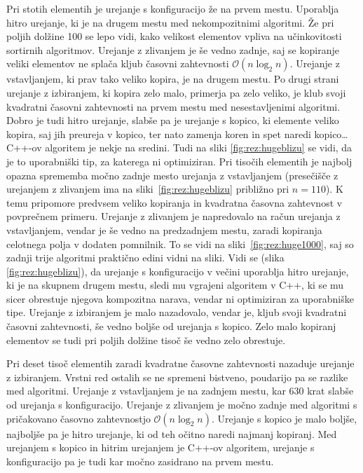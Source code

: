 \documentclass[a4paper,oneside,12pt]{article}
\begin{document}
Pri stotih elementih je urejanje s konfiguracijo že na prvem mestu. Uporablja
hitro urejanje, ki je na drugem mestu med nekompozitnimi algoritmi. Že pri
poljih dolžine 100 se lepo
vidi, kako velikost elementov vpliva na učinkovitosti sortirnih algoritmov.
Urejanje z zlivanjem je še vedno zadnje, saj se kopiranje veliki elementov ne
splača kljub časovni zahtevnosti $\mathcal{O}(n\log_2 n)$. Urejanje z
vstavljanjem, ki prav tako veliko kopira, je na drugem mestu. Po drugi strani
urejanje z izbiranjem, ki kopira zelo malo, primerja pa zelo veliko, je
klub svoji kvadratni časovni zahtevnosti na prvem mestu med nesestavljenimi
algoritmi. Dobro je tudi hitro urejanje, slabše pa je urejanje s kopico, ki
elemente veliko kopira, saj jih preureja v kopico, ter nato zamenja koren in spet
naredi kopico\dots \mbox{C++-ov} algoritem je nekje na sredini. Tudi na sliki
\ref{fig:rez:hugeblizu} se vidi, da je to
uporabniški tip, za katerega ni optimiziran.
Pri tisočih elementih je najbolj opazna sprememba močno zadnje mesto urejanja z
vstavljanjem (presečišče z urejanjem z zlivanjem ima na
sliki~\ref{fig:rez:hugeblizu} približno pri $n = 110$). K temu pripomore predvsem veliko kopiranja in kvadratna časovna
zahtevnost v povprečnem primeru. Urejanje z zlivanjem je napredovalo na račun
urejanja z vstavljanjem, vendar je še vedno na predzadnjem mestu, zaradi
kopiranja celotnega polja v dodaten pomnilnik. To se vidi na
sliki~\ref{fig:rez:huge1000}, saj so zadnji trije algoritmi praktično edini
vidni na sliki.
Vidi se (slika \ref{fig:rez:hugeblizu}), da urejanje s
konfiguracijo v večini uporablja hitro urejanje, ki je na skupnem drugem mestu, 
sledi mu vgrajeni algoritem v C++, ki se mu sicer obrestuje njegova kompozitna
narava, vendar ni optimiziran za uporabniške tipe. 
Urejanje z izbiranjem je malo nazadovalo, vendar je, kljub svoji kvadratni
časovni zahtevnosti, še vedno boljše od urejanja s kopico.
Zelo malo kopiranj elementov se tudi pri poljih dolžine
tisoč še vedno zelo obrestuje.

Pri deset tisoč elementih zaradi kvadratne časovne zahtevnosti nazaduje urejanje
z izbiranjem. Vrstni red ostalih se ne spremeni bistveno, poudarijo pa se
razlike med algoritmi. 
Urejanje z vstavljanjem je na zadnjem mestu, kar 630 krat slabše od urejanja s
konfiguracijo. Urejanje z zlivanjem je močno zadnje
med algoritmi s pričakovano časovno zahtevnostjo $\mathcal{O}(n\log_2n)$. 
Urejanje s kopico je malo boljše, najboljše pa je hitro urejanje, ki od teh
očitno naredi najmanj kopiranj. Med urejanjem s kopico in hitrim urejanjem je
\mbox{C++-ov} algoritem, urejanje s konfiguracijo pa je tudi kar močno zasidrano na
prvem mestu.
\end{document}
